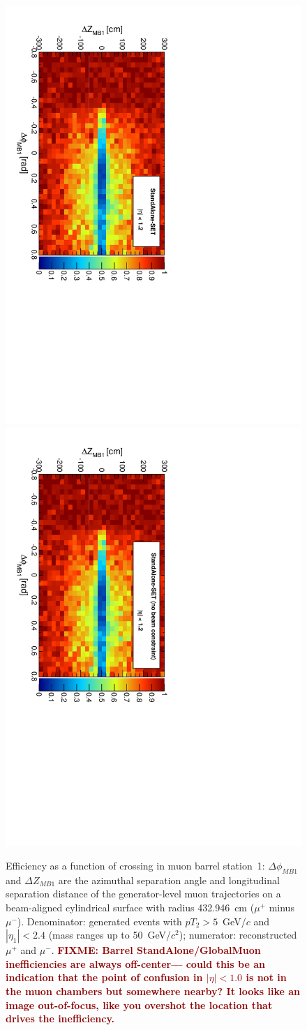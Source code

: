 \documentclass[12pt]{article}
\newcommand{\fixme}[1]{\textcolor{darkred}{\bf FIXME: #1}}
\begin{document}
\begin{figure}[p]
\includegraphics[height=0.5\linewidth, angle=90]{fig/acceptance7_plot/mb1_StandAloneUpdatedSET.pdf}
\includegraphics[height=0.5\linewidth, angle=90]{fig/acceptance7_plot/mb1_StandAloneSET.pdf}

\caption{Efficiency as a function of crossing in muon barrel
  station~1: $\Delta\phi_{MB1}$ and $\Delta Z_{MB1}$ are the azimuthal
  separation angle and longitudinal separation distance of the
  generator-level muon trajectories on a beam-aligned cylindrical
  surface with radius 432.946~cm ($\mu^+$ minus $\mu^-$).
  Denominator: generated events with $pT_2 > 5$~GeV/$c$ and $|\eta_1|
  < 2.4$ (mass ranges up to 50~GeV/$c^2$); numerator: reconstructed
  $\mu^+$ and $\mu^-$. \fixme{Barrel StandAlone/GlobalMuon
    inefficiencies are always off-center--- could this be an
    indication that the point of confusion in $|\eta| < 1.0$ is not in
    the muon chambers but somewhere nearby?  It looks like an image
    out-of-focus, like you overshot the location that drives the
    inefficiency.} \label{fig:mb1}}
\end{figure}
\end{document}
